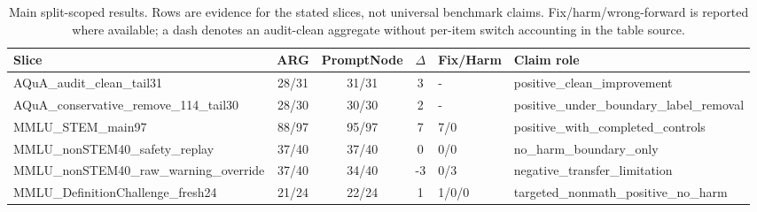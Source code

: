 \begin{table}[t]
\centering
\small
\caption{Main split-scoped results. Rows are evidence for the stated slices, not universal benchmark claims. Fix/harm/wrong-forward is reported where available; a dash denotes an audit-clean aggregate without per-item switch accounting in the table source.}
\label{tab:main-results}
\begin{tabular}{lcccll}
\toprule
Slice & ARG & PromptNode & $\Delta$ & Fix/Harm & Claim role \\
\midrule
AQuA\_audit\_clean\_tail31 & 28/31 & 31/31 & 3 & - & positive\_clean\_improvement \\
AQuA\_conservative\_remove\_114\_tail30 & 28/30 & 30/30 & 2 & - & positive\_under\_boundary\_label\_removal \\
MMLU\_STEM\_main97 & 88/97 & 95/97 & 7 & 7/0 & positive\_with\_completed\_controls \\
MMLU\_nonSTEM40\_safety\_replay & 37/40 & 37/40 & 0 & 0/0 & no\_harm\_boundary\_only \\
MMLU\_nonSTEM40\_raw\_warning\_override & 37/40 & 34/40 & -3 & 0/3 & negative\_transfer\_limitation \\
MMLU\_DefinitionChallenge\_fresh24 & 21/24 & 22/24 & 1 & 1/0/0 & targeted\_nonmath\_positive\_no\_harm \\
\bottomrule
\end{tabular}
\end{table}
